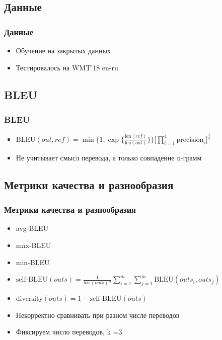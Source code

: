 \documentclass[unicode]{beamer}
\begin{document}
\subsection{Данные}
\begin{frame}
\frametitle{Данные}
\begin{itemize}
    \item Обучение на закрытых данных \newline
    \item Тестировалось на WMT'18 en-ru
\end{itemize}
\end{frame}


\subsection{BLEU}
\begin{frame}
\frametitle{BLEU}
\begin{itemize}
    \item $\textrm{BLEU}(out, ref) = \min \Bigg\{ 1, \exp \Big\{ \frac{\textrm{len}(ref)}{\textrm{len}(out)} \Big\} \Bigg\} \Big[ \prod\limits_{i=1}^4 \textrm{precision}_i \Big]^{\frac{1}{4}}$ \newline
    \item Не учитывает смысл перевода, а только совпадение n-грамм
\end{itemize}

\end{frame}


\subsection{Метрики качества и разнообразия}
\begin{frame}
\frametitle{Метрики качества и разнообразия}
\begin{itemize}
    \item avg-BLEU \newline
    \item max-BLEU \newline
    \item min-BLEU \newline
    \item $\textrm{self-BLEU}(outs) = \frac{1}{\textrm{len} \, (outs) \, ^2} \sum\limits_{i=1}^m \sum\limits_{j=1}^m \textrm{BLEU} (outs_i, outs_j )$ \newline
    \item $\textrm{diversity}(outs) = 1 - \textrm{self-BLEU}(outs)$ \newline
    \item Некорректно сравнивать при разном числе переводов \newline
    \item Фиксируем число переводов, k =3
\end{itemize}
\end{frame}
\end{document}
